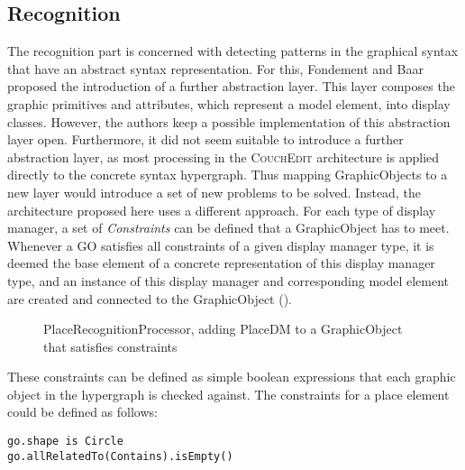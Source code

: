 \subsection{Recognition}
\label{sec:recognition}
The recognition part is concerned with detecting patterns in the graphical syntax that have an abstract syntax representation. For this, Fondement and Baar proposed the introduction of a further abstraction layer. This layer composes the graphic primitives and attributes, which represent a model element, into display classes. However, the authors keep a possible implementation of this abstraction layer open. Furthermore, it did not seem suitable to introduce a further abstraction layer, as most processing in the \textsc{CouchEdit} architecture is applied directly to the concrete syntax hypergraph. Thus mapping GraphicObjects to a new layer would introduce a set of new problems to be solved. Instead, the architecture proposed here uses a different approach. For each type of display manager, a set of \emph{Constraints} can be defined that a GraphicObject has to meet. Whenever a GO satisfies all constraints of a given display manager type, it is deemed the base element of a concrete representation of this display manager type, and an instance of this display manager and corresponding model element are created and connected to the GraphicObject ().


\begin{figure}
  \centering
  
  \caption{PlaceRecognitionProcessor, adding PlaceDM to a GraphicObject that satisfies constraints}
  \label{fig:place-recognition}
\end{figure}

These constraints can be defined as simple boolean expressions that each graphic object in the hypergraph is checked against. The constraints for a place element could be defined as follows:

\begin{lstlisting}[language=OCL,caption={Possible constraints to detect GOs representing a place},captionpos=b]
go.shape is Circle
go.allRelatedTo(Contains).isEmpty()
\end{lstlisting}

